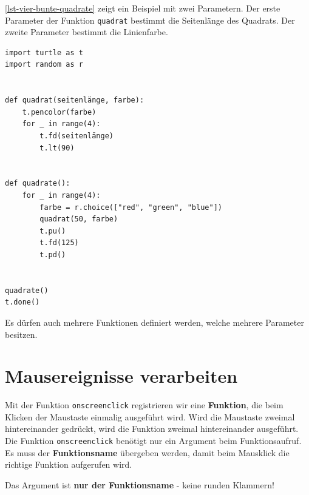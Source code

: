 \begin{example}
\autoref{lst-vier-bunte-quadrate} zeigt ein Beispiel mit zwei Parametern. Der erste Parameter der Funktion \lstinline[language={python3}]{quadrat} bestimmt die Seitenlänge des Quadrats. Der zweite Parameter bestimmt die Linienfarbe.
 
\begin{lstlisting}[language={python3}, caption={Funktion mit zwei Parametern (\graybgtexttt{vier\_bunte\_quadrate.py}).}, label={lst-vier-bunte-quadrate}]
import turtle as t
import random as r


def quadrat(seitenlänge, farbe):
	t.pencolor(farbe)
	for _ in range(4):
		t.fd(seitenlänge)
		t.lt(90)


def quadrate():
	for _ in range(4):
		farbe = r.choice(["red", "green", "blue"])
		quadrat(50, farbe)
		t.pu()
		t.fd(125)
		t.pd()


quadrate()
t.done()

\end{lstlisting}
\end{example}

Es dürfen auch mehrere Funktionen definiert werden, welche mehrere Parameter besitzen.


\section{Mausereignisse verarbeiten}

Mit der Funktion \lstinline[language={python3}]{onscreenclick} registrieren wir eine \textbf{Funktion}, die beim Klicken der Maustaste einmalig ausgeführt wird. Wird die Maustaste zweimal hintereinander gedrückt, wird die Funktion zweimal hintereinander ausgeführt. Die Funktion \lstinline[language={python3}]{onscreenclick} benötigt nur ein Argument beim Funktionsaufruf. Es muss der \textbf{Funktionsname} übergeben werden, damit beim Mausklick die richtige Funktion aufgerufen wird.

\begin{important}
Das Argument ist \textbf{nur der Funktionsname} - keine runden Klammern!
\end{important}

